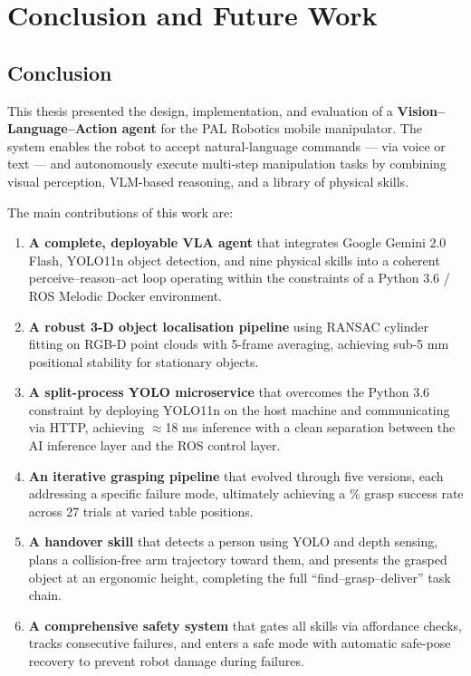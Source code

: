 \chapter{Conclusion and Future Work}
\label{ch:conclusion}

\section{Conclusion}

This thesis presented the design, implementation, and evaluation of a
\textbf{Vision--Language--Action agent} for the PAL Robotics \tiago{} mobile
manipulator.
The system enables the robot to accept natural-language commands — via voice or text
— and autonomously execute multi-step manipulation tasks by combining visual
perception, VLM-based reasoning, and a library of physical skills.

The main contributions of this work are:

\begin{enumerate}
  \item \textbf{A complete, deployable VLA agent} that integrates Google Gemini 2.0
        Flash, YOLO11n object detection, and nine physical skills into a coherent
        perceive--reason--act loop operating within the constraints of a Python 3.6
        / ROS Melodic Docker environment.

  \item \textbf{A robust 3-D object localisation pipeline} using RANSAC cylinder
        fitting on RGB-D point clouds with 5-frame averaging, achieving sub-5 mm
        positional stability for stationary objects.

  \item \textbf{A split-process YOLO microservice} that overcomes the Python 3.6
        constraint by deploying YOLO11n on the host machine and communicating via HTTP,
        achieving $\approx$18 ms inference with a clean separation between the
        AI inference layer and the ROS control layer.

  \item \textbf{An iterative grasping pipeline} that evolved through five versions,
        each addressing a specific failure mode, ultimately achieving a \%
        grasp success rate across 27 trials at varied table positions.

  \item \textbf{A handover skill} that detects a person using YOLO and depth sensing,
        plans a collision-free arm trajectory toward them, and presents the grasped
        object at an ergonomic height, completing the full ``find--grasp--deliver''
        task chain.

  \item \textbf{A comprehensive safety system} that gates all skills via affordance
        checks, tracks consecutive failures, and enters a safe mode with automatic
        safe-pose recovery to prevent robot damage during failures.
\end{enumerate}

